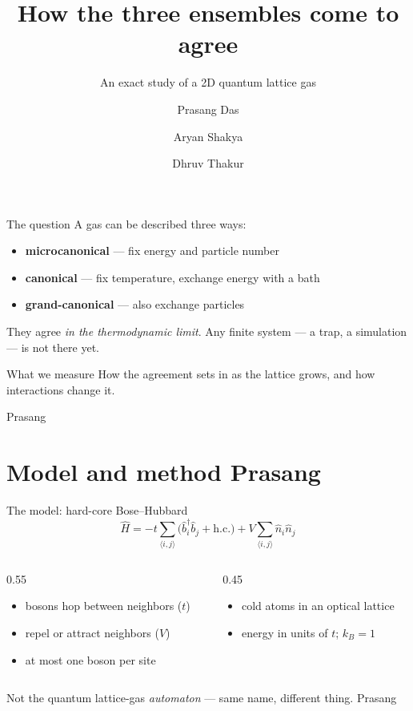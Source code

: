 \documentclass[10pt,aspectratio=169]{beamer}
\title{How the three ensembles come to agree}
\subtitle{An exact study of a 2D quantum lattice gas}
\author{Prasang Das \and Aryan Shakya \and Dhruv Thakur}
\date{}
\newcommand{\speaker}[1]{\hfill{\scriptsize\color{gray}#1}}
\begin{document}
\maketitle

\begin{frame}{The question}
  A gas can be described three ways:
  \begin{itemize}
    \item \textbf{microcanonical} --- fix energy and particle number
    \item \textbf{canonical} --- fix temperature, exchange energy with a bath
    \item \textbf{grand-canonical} --- also exchange particles
  \end{itemize}
  \vspace{0.5em}
  They agree \emph{in the thermodynamic limit}. Any finite system --- a trap, a
  simulation --- is not there yet.
  \vspace{0.5em}
  \begin{alertblock}{What we measure}
    How the agreement sets in as the lattice grows, and how interactions change it.
  \end{alertblock}
  \speaker{Prasang}
\end{frame}

\section{Model and method \hfill\normalfont\scriptsize Prasang}

\begin{frame}{The model: hard-core Bose--Hubbard}
  \[
  \hat H=-t\!\sum_{\langle i,j\rangle}\!\big(\hat b_i^\dagger \hat b_j+\text{h.c.}\big)
  +V\!\sum_{\langle i,j\rangle}\!\hat n_i \hat n_j
  \]
  \begin{columns}[T]
    \begin{column}{0.55\textwidth}
      \begin{itemize}
        \item bosons hop between neighbors ($t$)
        \item repel or attract neighbors ($V$)
        \item at most one boson per site
      \end{itemize}
    \end{column}
    \begin{column}{0.45\textwidth}
      \begin{itemize}
        \item cold atoms in an optical lattice
        \item energy in units of $t$; $k_B=1$
      \end{itemize}
    \end{column}
  \end{columns}
  \vspace{0.4em}
  {\footnotesize Not the quantum lattice-gas \emph{automaton} --- same name, different thing.}
  \speaker{Prasang}
\end{frame}
\end{document}
